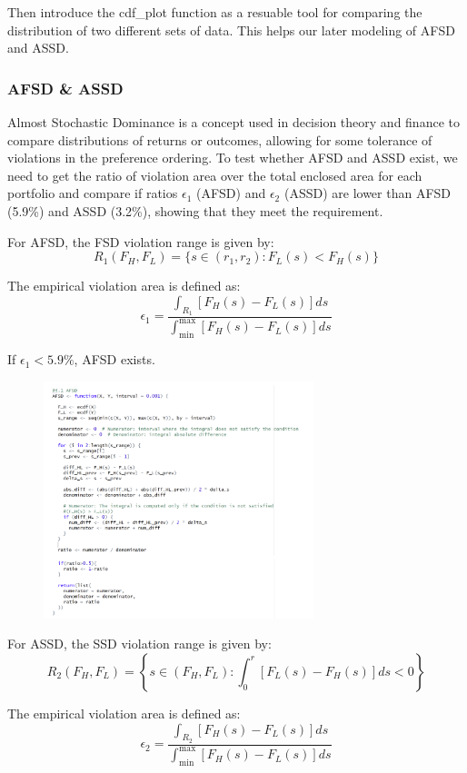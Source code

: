 \documentclass{article}
\begin{document}
Then introduce the cdf\_plot function as a resuable tool for comparing the distribution of two different sets of data. This helps our later modeling of AFSD and ASSD.

\hypertarget{AFSD \& ASSD}{%
\subsubsection{AFSD \& ASSD}\label{AFSD \& ASSD}}
Almost Stochastic Dominance is a concept used in decision theory and finance to compare distributions of returns or outcomes, allowing for some tolerance of violations in the preference ordering. To test whether AFSD and ASSD exist, we need to get the ratio of violation area over the total enclosed area for each portfolio and compare if ratios $\epsilon_1$ (AFSD) and $\epsilon_2$ (ASSD) are lower than AFSD (5.9\%) and ASSD (3.2\%), showing that they meet the requirement.

For AFSD, the FSD violation range is given by:
\[
R_1(F_H, F_L) = \{s \in (r_1, r_2): F_L(s) < F_H(s)\}
\]

The empirical violation area is defined as:
\[
\epsilon_1 = \frac{\int_{R_1} \left[F_H(s) - F_L(s)\right] ds}{\int_{\text{min}}^{\text{max}} \left[F_H(s) - F_L(s)\right] ds}
\]

If $\epsilon_1 < 5.9\%$, AFSD exists.
\begin{figure}[H]
    \centering
    \includegraphics[width=0.7\textwidth]{11.png}
    \label{fig:example}
\end{figure}
For ASSD, the SSD violation range is given by:
\[
R_2(F_H, F_L) = \left\{ s \in (F_H, F_L) : \int_0^r \left[ F_L(s) - F_H(s) \right] ds < 0 \right\}
\]

The empirical violation area is defined as:
\[
\epsilon_2 = \frac{\int_{R_2} \left[ F_H(s) - F_L(s) \right] ds}{\int_{\text{min}}^{\text{max}} \left[ F_H(s) - F_L(s) \right] ds}
\]
\end{document}
